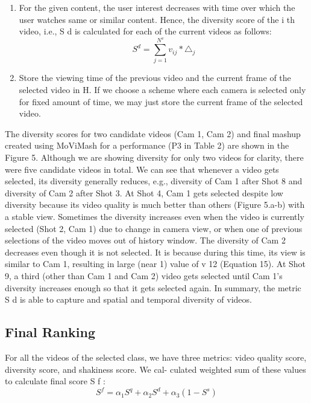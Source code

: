\documentclass{sig-alternate}
\begin{document}
\begin{enumerate}
\itemDetermine the view similarity matrix V S by comparing cur-
rent frame with the frames stored in the history, i.e.,
\begin{equation}
 v_{ij} = Diff(I^c_i ,I^h_j) 
\end{equation} where I i c is the current frame of i th camera, I j h is the j th
frame of the history, and Dif f can be any function to calcu-
late view similarity. We are using SSIM [17] for this purpose.
\item  For the given content, the user interest decreases with time
over which the user watches same or similar content. Hence,
the diversity score of the i th video, i.e., S d is calculated for
each of the current videos as follows:
\begin{equation}
S^d = \sum_{j=1}^{N^v}v_{ij} * \triangle_j
\end{equation}
\item Store the viewing time of the previous video and the current
frame of the selected video in H. If we choose a scheme
where each camera is selected only for fixed amount of time,
we may just store the current frame of the selected video.
\end{enumerate}
The diversity scores for two candidate videos (Cam 1, Cam 2)
and final mashup created using MoViMash for a performance (P3
in Table 2) are shown in the Figure 5. Although we are showing
diversity for only two videos for clarity, there were five candidate
videos in total. We can see that whenever a video gets selected,
its diversity generally reduces, e.g., diversity of Cam 1 after Shot 8
and diversity of Cam 2 after Shot 3. At Shot 4, Cam 1 gets selected
despite low diversity because its video quality is much better than
others (Figure 5.a-b) with a stable view. Sometimes the diversity
increases even when the video is currently selected (Shot 2, Cam 1)
due to change in camera view, or when one of previous selections
of the video moves out of history window. The diversity of Cam 2
decreases even though it is not selected. It is because during this
time, its view is similar to Cam 1, resulting in large (near 1) value
of v 12 (Equation 15). At Shot 9, a third (other than Cam 1 and Cam
2) video gets selected until Cam 1’s diversity increases enough so
that it gets selected again. In summary, the metric S d is able to
capture and spatial and temporal diversity of videos.
\subsection{Final Ranking}
For all the videos of the selected class, we have three metrics:
video quality score, diversity score, and shakiness score. We cal-
culated weighted sum of these values to calculate final score S f :
\begin{equation}
 S^f = \alpha_1S^q + \alpha_2S^d + \alpha_3(1 - S^s)
\end{equation}
\end{document}
